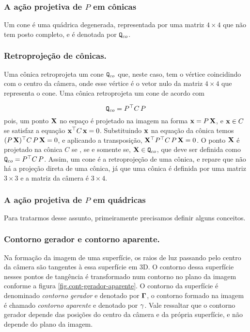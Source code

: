 \subsubsection*{A ação projetiva de $P$ em cônicas}
Um cone é uma quádrica degenerada, representada por uma matriz $4\times4$ que não tem posto completo, e é denotada por ${\tt Q}_{co}$.

\subsubsection*{Retroprojeção de cônicas.}
Uma cônica retroprojeta um cone ${\tt Q}_{co}$ que, neste caso, tem o vértice coincidindo com o centro da câmera, onde esse vértice é o vetor nulo da matriz $4\times4$ que representa o cone. Uma cônica retroprojeta um cone de acordo com 

\begin{equation*}
{\tt Q}_{co}=P^\top C\,P
\end{equation*}
pois, um ponto $\mathbf{X}$ no espaço é projetado na imagem na forma $\mathbf{x}=P\,\mathbf{X}$, e $\mathbf{x}\in C$ se satisfaz a equação $\mathbf{x}^\top C\,\mathbf{x}=0$. Substituindo $\mathbf{x}$ na equação da cônica temos $(P\,\mathbf{X})^\top C\,P\,\mathbf{X}=0$, e aplicando a transposição, $\mathbf{X}^\top P^\top C\,P\,\mathbf{X}=0$. O ponto $\mathbf{X}$ é projetado na cônica $C$ se , se e somente se, $\mathbf{X}\in {\tt Q}_{co}$, que deve ser definida como ${\tt Q}_{co}=P^\top C\,P$. Assim, um cone é a retroprojeção de uma cônica, e repare que não há a projeção direta de uma cônica, já que uma cônica é definida por uma matriz $3\times3$ e a matriz da câmera é $3\times4$.

\subsubsection{A ação projetiva de $P$ em quádricas}\label{sec.proj-quadricas}
Para tratarmos desse assunto, primeiramente precisamos definir alguns conceitos.

\subsubsection*{Contorno gerador e contorno aparente.}
Na formação da imagem de uma superfície, os raios de luz passando pelo centro da câmera são tangentes à essa superfície em 3D. O contorno dessa superfície nesses pontos de tangência é transformado num contorno no plano da imagem conforme a figura \ref{fig.cont-gerador-aparente}. O contorno da superfície é denominado \textit{contorno gerador} e denotado por ${\bf \Gamma}$, o contorno formado na imagem é chamado \textit{contorno aparente} e denotado por ${\bf \gamma}$. Vale ressaltar que o contorno gerador depende das posições do centro da câmera e da própria superfície, e não depende do plano da imagem.  

